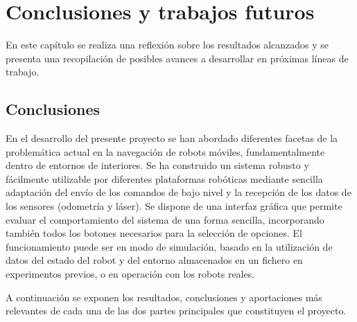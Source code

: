
\chapter{Conclusiones y trabajos futuros}\label{ch:conclusiones}

En este capítulo se realiza una reflexión sobre los resultados alcanzados y se presenta una recopilación de posibles avances a desarrollar en próximas líneas de trabajo.

\section{Conclusiones}

En el desarrollo del presente proyecto se han abordado diferentes facetas de la problemática actual en la navegación de robots móviles, fundamentalmente dentro de entornos de interiores. Se ha construido un sistema robusto y fácilmente utilizable por diferentes plataformas robóticas mediante sencilla adaptación del envío de los comandos de bajo nivel y la recepción de los datos de los sensores (odometría y láser). Se dispone de una interfaz gráfica que permite evaluar el comportamiento del sistema de una forma sencilla, incorporando también todos los botones necesarios para la selección de opciones. El funcionamiento puede ser en modo de simulación, basado en la utilización de datos del estado del robot y del entorno almacenados en un fichero en experimentos previos, o en operación con los robots reales.

A continuación se exponen los resultados, conclusiones y aportaciones más relevantes de cada una de las dos partes principales que constituyen el proyecto.

